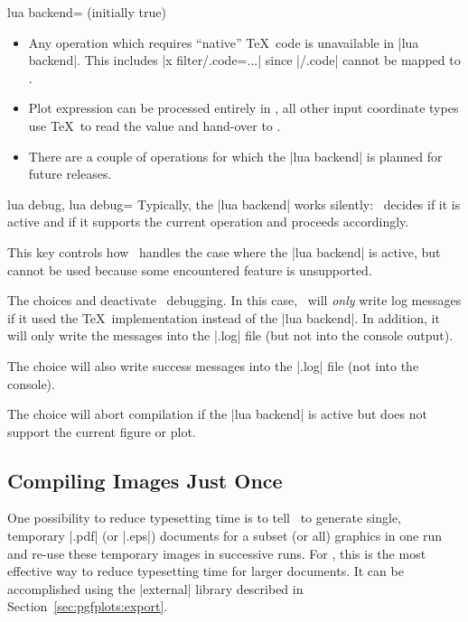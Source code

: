 {\begin{pgfplotskey}{lua backend= (initially true)}
\begin{itemize}
		Both are semantically equivalent, but since \lua\ cannot interprete \TeX\ macros, it refuses to process the ``Don't'' case. The ``Don't'' case results in a log message

\texttt{Package pgfplots info on input line 16: Deactivating LUA version of plot expression for plot 0 (type 'pgfplothandlerlineto'): y expression '\textbackslash constantC *x' contains a TeX macro.}

		\item Any operation which requires ``native'' \TeX\ code is unavailable in |lua backend|. This includes |x filter/.code={...}| since |/.code| cannot be mapped to \lua.

		\item Plot expression can be processed entirely in \lua, all other input coordinate types use \TeX\ to read the value and hand-over to \lua.

		\item There are a couple of operations for which the |lua backend| is planned for future releases.
	\end{itemize}
\end{pgfplotskey}

\begin{pgfplotskeylist}{lua debug, lua debug=}
	Typically, the |lua backend| works silently: \PGFPlots\ decides if it is active and if it supports the current operation and proceeds accordingly. 

	This key controls how \PGFPlots\ handles the case where the |lua backend| is active, but cannot be used because some encountered feature is unsupported.

	The choices  and  deactivate \lua\ debugging. In this case, \PGFPlots\ will \emph{only} write log messages if it used the \TeX\ implementation instead of the |lua backend|. In addition, it will only write the messages into the |.log| file (but not into the console output).

	The choice  will also write success messages into the |.log| file (not into the console).

	The choice  will abort compilation if the |lua backend| is active but does not support the current figure or plot.
\end{pgfplotskeylist}

\subsection{Compiling Images Just Once}
One possibility to reduce typesetting time is to tell \PGF\ to generate single, temporary |.pdf| (or |.eps|) documents for a subset (or all) graphics in one run and re-use these temporary images in successive runs. For \PGFPlots, this is the most effective way to reduce typesetting time for larger documents. It can be accomplished using the |external| library described in Section~\ref{sec:pgfplots:export}.
}
